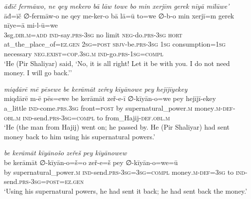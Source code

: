 \ea \label{ŽP.105}
\textit{āđīč fermāwo, ne qey mekero bā lāw towe bo min xerjīm gerek nīyā milūwe’} \\ 
\gll āđ=īč ∅-fermāw-o ne qey me-ker-o bā lā=ū to=we ∅-b-o min xerjī=m gerek nīye=ā mi-l-ū=we \\ 
 3sg\textsc{.dir}\textsc{.m}\textsc{=add} \textsc{ind-}say\textsc{.prs}\textsc{-3sg} no limit \textsc{neg-}do\textsc{.prs}\textsc{-3sg} \textsc{hort} at\_the\_place\_of\textsc{\textsc{=ez.gen}} \textsc{2sg}\textsc{=\textsc{post}} \textsc{sbjv-}be\textsc{.prs}\textsc{-3sg} \textsc{1sg} consumption\textsc{=\textsc{1sg}} necessary \textsc{\textsc{neg.}exist}\textsc{=cop}\textsc{.3sg}\textsc{.m} \textsc{ind-}go\textsc{.prs}\textsc{-\textsc{1sg}}\textsc{=compl} \\ 
\glt `He (Pir Shaliyar) said, ‘No, it is all right! Let it be with you. I do not need money. I will go back.’'
\z 
 
\ea \label{ŽP.109}
\textit{miqdārē mē pēsewe be kerāmāt zeřey kīyānowe pey hejījīyekey} \\ 
\gll miqdārē m-ē pēs=ewe be kerāmāt zeř-e-ī ∅-kīyān-o=we pey hejījī-ekey \\ 
 a\_little \textsc{ind-}come\textsc{.prs}\textsc{.3sg} front\textsc{=\textsc{post}} by supernatural\_power\textsc{.m} money\textsc{.m}\textsc{-def}\textsc{-obl}\textsc{.m} \textsc{ind-}send\textsc{.prs}\textsc{-3sg}\textsc{=compl} to from\_Hajij\textsc{-def}\textsc{.obl}\textsc{.m} \\ 
\glt `He (the man from Hajij) went on; he passed by. He (Pir Shaliyar) had sent money back to him using his supernatural powers.'
\z 
 
\ea \label{ŽP.110}
\textit{be kerāmāt kīyānošo zeřeš pey kīyānowew} \\ 
\gll be kerāmāt ∅-kīyān-o=š=o zeř-e=š pey ∅-kīyān-o=we=ū \\ 
 by supernatural\_power\textsc{.m} \textsc{ind-}send\textsc{.prs}\textsc{-3sg}\textsc{=3sg}\textsc{=compl} money\textsc{.m}\textsc{-def}\textsc{=3sg} to \textsc{ind-}send\textsc{.prs}\textsc{-3sg}\textsc{=\textsc{post}}\textsc{\textsc{=ez.gen}} \\ 
\glt `Using his supernatural powers, he had sent it back; he had sent back the money.'
\z 
 
